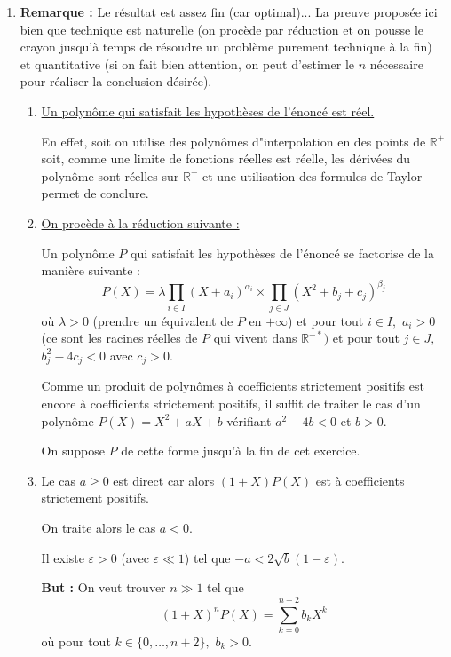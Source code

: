 \begin{enumerate}
 
\item \textbf{Remarque :} Le résultat est assez fin (car optimal)... La preuve proposée ici bien que technique est naturelle (on procède par réduction et on pousse le crayon jusqu'à temps de résoudre un problème purement technique à la fin) et quantitative (si on fait bien attention, on peut d'estimer le $n$ nécessaire pour réaliser la conclusion désirée).\\

\begin{enumerate}
\item \underline{Un polynôme qui satisfait les hypothèses de l'énoncé est réel.}
    
En effet, soit on utilise des polynômes d"interpolation en des points de $\mathbb{R}^{+}$ soit, comme une limite de fonctions réelles est réelle, les dérivées du polynôme sont réelles sur $\mathbb{R}^{+}$ et une utilisation des formules de Taylor permet de conclure.

\item \underline{On procède à la réduction suivante :}

Un polynôme $P$ qui satisfait les hypothèses de l'énoncé se factorise de la  manière suivante : 
$$P(X)=\lambda\prod_{i\in I}(X+a_{i})^{\alpha_{i}}\times \prod_{j\in J}(X^{2}+b_{j}+c_{j})^{\beta_{j}}$$ 
où $\lambda>0$ (prendre un équivalent de $P$ en $+\infty$) et pour tout $i\in I,$ $a_{i}>0$ (ce sont les racines réelles de $P$ qui vivent dans $\mathbb{R}^{-*})$ et pour tout $j\in J,$ $b_{j}^{2}-4c_{j}<0$ avec $c_{j}>0.$

Comme un produit de polynômes à coefficients strictement positifs est encore à coefficients strictement positifs, il suffit de traiter le cas d'un polynôme $P(X)=X^{2}+aX+b$ vérifiant $a^{2}-4b<0$ et $b>0.$

On suppose $P$ de cette forme jusqu'à la fin de cet exercice.

\item Le cas $a\geq 0$ est direct car alors $(1+X)P(X)$ est à coefficients strictement positifs.

On traite alors le cas $a<0.$

Il existe $\varepsilon>0$ (avec $\varepsilon\ll 1$) tel que $-a<2\sqrt{b}(1-\varepsilon).$

\textbf{But :} On veut trouver $n\gg 1$ tel que $$(1+X)^{n}P(X)=\sum_{k=0}^{n+2}b_{k}X^{k}$$ où pour tout  $k\in\{0,\ldots,n+2\},$ $b_{k}>0.$


\end{enumerate}
\end{enumerate}
